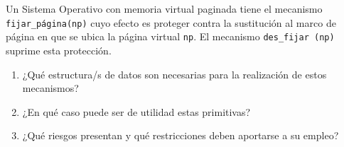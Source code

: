 \begin{ejercicio}
    Un Sistema Operativo con memoria virtual paginada tiene el mecanismo \verb|fijar_página(np)|
cuyo efecto es proteger contra la sustitución al marco de página en que se ubica la página
virtual \verb|np|. El mecanismo \verb|des_fijar (np)| suprime esta protección.

\begin{enumerate}
    \item ¿Qué estructura/s de datos son necesarias para la realización de estos mecanismos?
    \item ¿En qué caso puede ser de utilidad estas primitivas?
    \item ¿Qué riesgos presentan y qué restricciones deben aportarse a su empleo?
\end{enumerate}
\end{ejercicio}


